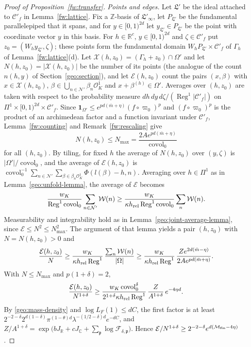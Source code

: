 \documentclass[11pt]{amsart}
\numberwithin{equation}{section}
\theoremstyle{definition}
\theoremstyle{remark}
\DeclareMathOperator{\covol}{covol}
\newcommand{\R}{\mathbb R}
\newcommand{\C}{\mathbb C}
\newcommand{\Z}{\mathbb Z}
\begin{document}
\begin{proof}[Proof of Proposition~\ref{fw:transfer}]
\emph{Points and edges.} Let $\mathfrak L'$ be the ideal attached to
$\mathcal C'_f$ in Lemma~\ref{fw:lattice}. Fix a $\Z$-basis of
$\mathfrak L'_\infty$, let $P_{\mathfrak L'}$ be the fundamental
parallelepiped that it spans, and for $y\in[0,1)^{2d}$ let
$y_{\mathfrak L'}\in P_{\mathfrak L'}$ be the point with coordinate
vector $y$ in this basis. For $h\in\R^c$, $y\in[0,1)^{2d}$ and
$\zeta\in\mathcal C'_f$ put $z_0=(W_hy_{\mathfrak L'},\zeta)$; these
points form the fundamental domain $W_hP_{\mathfrak L'}\times\mathcal
C'_f$ of $\Gamma_h$ of Lemma~\ref{fw:lattice}(d). Let
$\mathcal X(h,z_0)=(\Gamma_h+z_0)\cap\Omega'$ and let
$N(h,z_0)=|\mathcal X(h,z_0)|$ be the number of its points (the analogue
of the count $n(h,y)$ of Section~\ref{geo:section}), and let
$\mathcal E(h,z_0)$ count the pairs $(x,\beta)$ with
$x\in\mathcal X(h,z_0)$, $\beta\in\bigcup_{n\in\mathcal N'}\beta_n\mathcal
O_K^1$ and $x+\beta^{(h)}\in\Omega'$. Averages over $(h,z_0)$ are taken
with respect to the probability measure
$dh\,dy\,d\zeta/(\operatorname{Reg}^1|\mathcal C'_f|)$ on
$\Pi^1\times[0,1)^{2d}\times\mathcal C'_f$. Since
$\mathbf 1_{\Omega'}\le e^{pd(\bar m+\eta)}(f\circ\varpi_0)^p$ and
$(f\circ\varpi_0)^p$ is the product of an archimedean factor and a
function invariant under $\mathcal C'_f$, Lemma~\ref{fw:counting} and
Remark~\ref{fw:rescaling} give
\[
 N(h,z_0)\le N_{\max}=\frac{2Ae^{pd(\bar m+\eta)}}{\covol_0}
\]
for all $(h,z_0)$. By tiling, for fixed $h$ the average of $N(h,z_0)$
over $(y,\zeta)$ is $|\Omega'|/\covol_0$, and the average of
$\mathcal E(h,z_0)$ is
$\covol_0^{-1}\sum_{n\in\mathcal N'}\sum_{\beta\in\beta_n\mathcal O_K^1}
\Phi(l(\beta)-h,n)$. Averaging over $h\in\Pi^1$ as in
Lemma~\ref{geo:unfold-lemma}, the average of $\mathcal E$ becomes
\[
 \frac{w_K}{\operatorname{Reg}^1\covol_0}\sum_{n\in\mathcal N'}\mathcal W(n)
 \ge\frac{w_K}{\kappa h_{\rm rel}\operatorname{Reg}^1\covol_0}
 \sum_n\mathcal W(n).
\]
Measurability and integrability hold as in
Lemma~\ref{geo:joint-average-lemma}, since $\mathcal E\le N^2\le
N_{\max}^2$. The argument of that lemma yields a pair $(h,z_0)$ with
$N=N(h,z_0)>0$ and
\[
 \frac{\mathcal E(h,z_0)}N\ge\frac{w_K}{\kappa h_{\rm rel}
 \operatorname{Reg}^1}\,\frac{\sum_n\mathcal W(n)}{|\Omega|}
 \ge\frac{w_K}{\kappa h_{\rm rel}\operatorname{Reg}^1}\,
 \frac{Ze^{2d(\bar m-\eta)}}{2Ae^{pd(\bar m+\eta)}} .
\]
With $N\le N_{\max}$ and $p(1+\delta)=2$,
\[
 \frac{\mathcal E(h,z_0)}{N^{1+\delta}}\ge
 \frac{w_K\covol_0^\delta}{2^{1+\delta}\kappa h_{\rm rel}
 \operatorname{Reg}^1}\,\frac{Z}{A^{1+\delta}}\,e^{-4\eta d}.
\]
By \eqref{geo:mass-density} and $\log L_F(1)\le dC$, the first factor
is at least
$2^{-2-\delta}2^{d(1-\delta)}\pi^{(1-\theta)d}\lambda^{-(1/2-\delta)d}e^{-dC}$,
and $Z/A^{1+\delta}=\exp\bigl(bJ_\R+cJ_\C+\sum_{\mathfrak p}\log\mathcal
F_{\delta,\mathfrak p}\bigr)$. Hence
$\mathcal E/N^{1+\delta}\ge2^{-2-\delta}e^{d(\mathcal M_{\rm
fin}-4\eta)}$.


\end{proof}
\end{document}
